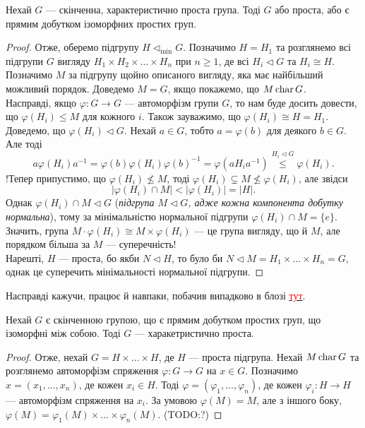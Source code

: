 \documentclass{math_library}
\begin{document}
\begin{theorem}
Нехай $G$ --- скінченна, характеристично проста група. Тоді $G$ або проста, або є прямим добутком ізоморфних простих груп.
\end{theorem}

\begin{proof}
Отже, оберемо підгрупу $H \triangleleft_{\text{min}} G$. Позначимо $H = H_1$ та розглянемо всі підгрупи $G$ вигляду $H_1 \times H_2 \times \dots \times H_n$ при $n \geq 1$, де всі $H_i \triangleleft G$ та $H_i \cong H$. Позначимо $M$ за підгрупу щойно описаного вигляду, яка має найбільший можливий порядок. Доведемо $M = G$, якщо покажемо, що $M \operatorname{char} G$.\\
Насправді, якщо $\varphi \colon G \to G$ --- автоморфізм групи $G$, то нам буде досить довести, що $\varphi(H_i) \leq M$ для кожного $i$. Також зауважимо, що $\varphi(H_i) \cong H = H_1$.\\
Доведемо, що $\varphi(H_i) \triangleleft G$. Нехай $a \in G$, тобто $a = \varphi(b)$ для деякого $b \in G$. Але тоді
\[
a \varphi(H_i) a^{-1} = \varphi(b) \varphi(H_i) \varphi(b)^{-1} = \varphi(a H_i a^{-1}) \overset{H_i \triangleleft G}{\leq} \varphi(H_i).
\]
!Тепер припустимо, що $\varphi(H_i) \not\leq M$, тоді $\varphi(H_i) \subsetneq M \not\leq \varphi(H_i)$, але звідси
\[
|\varphi(H_i) \cap M| < |\varphi(H_i)| = |H|.
\]
Однак $\varphi(H_i) \cap M \triangleleft G$ (\textit{підгрупа $M \triangleleft G$, адже кожна компонента добутку нормальна}), тому за мінімальністю нормальної підгрупи $\varphi(H_i) \cap M = \{e\}$. Значить, група $M \cdot \varphi(H_i) \cong M \times \varphi(H_i)$ --- це група вигляду, що й $M$, але порядком більша за $M$ --- суперечність!\\
Нарешті, $H$ --- проста, бо якби $N \triangleleft H$, то було би $N \triangleleft M = H_1 \times \dots \times H_n = G$, однак це суперечить мінімальності нормальної підгрупи.
\end{proof}

Насправді кажучи, працює й навпаки, побачив випадково в блозі \href{https://ysharifi.wordpress.com/2024/06/12/characteristically-simple-groups/}{\textcolor{red}{тут}}.

\begin{theorem}
Нехай $G$ є скінченною групою, що є прямим добутком простих груп, що ізоморфні між собою. Тоді $G$ --- харакетристично проста.
\end{theorem}

\begin{proof}
Отже, нехай $G = H \times \dots \times H$, де $H$ --- проста підгрупа. Нехай $M \operatorname{char} G$ та розглянемо автоморфізм спряження $\varphi \colon G \to G$ на $x \in G$. Позначимо $x = (x_1,\dots,x_n)$, де кожен $x_i \in H$. Тоді $\varphi = (\varphi_1,\dots,\varphi_n)$, де кожен $\varphi_i \colon H \to H$ --- автоморфізм спряження на $x_i$. За умовою $\varphi(M) = M$, але з іншого боку, $\varphi(M) = \varphi_1(M) \times \dots \times \varphi_n(M)$. (TODO:?)
\end{proof}
\end{document}
